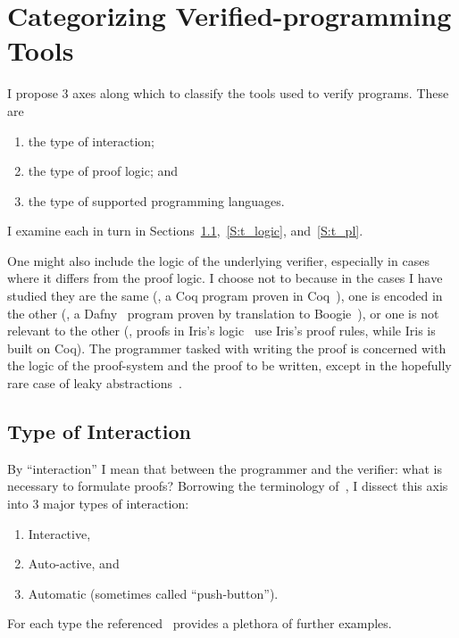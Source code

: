 \section{Categorizing Verified-programming Tools}\label{S:categories}

I propose 3 axes along which to classify the tools used to verify programs.
These are
\begin{enumerate}
    \item the type of interaction;
    \item the type of proof logic; and
    \item the type of supported programming languages.
\end{enumerate}

I examine each in turn in Sections~\ref{S:t_interaction},~\ref{S:t_logic},
and~\ref{S:t_pl}.

One might also include the logic of the underlying verifier, especially in cases
where it differs from the proof logic. I choose not to because in the cases I
have studied they are the same (\eg, a Coq program proven in Coq~\cite{Coq}),
one is encoded in the other (\eg, a Dafny~\cite{leino2010dafny} program proven
by translation to Boogie~\cite{Barnett_2006,leino2008this}), or one is not
relevant to the other (\eg, proofs in Iris's logic~\cite{Jung_2018b} use Iris's
proof rules, while Iris is built on Coq). The programmer tasked with writing the
proof is concerned with the logic of the proof-system and the proof to be
written, except in the hopefully rare case of leaky
abstractions~\cite{Spolsky_2002}.

\subsection{Type of Interaction}\label{S:t_interaction}

By ``interaction'' I mean that between the programmer and the verifier: what is
necessary to formulate proofs? Borrowing the terminology of~\cite[\S 2]{Nelson_2019},
I dissect this axis into 3 major types of interaction:
\begin{enumerate}
    \item Interactive,
    \item Auto-active, and
    \item Automatic (sometimes called ``push-button'').
\end{enumerate}

For each type the referenced~\cite{Nelson_2019} provides a plethora of further
examples.

